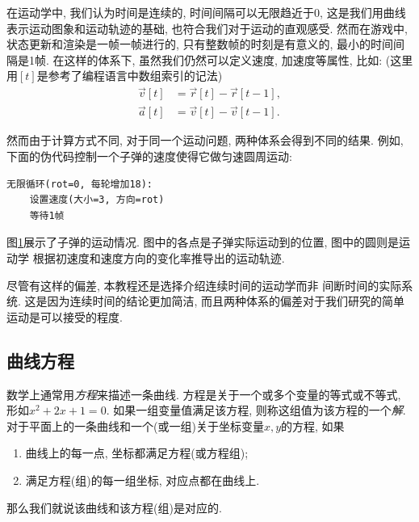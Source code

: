 在运动学中, 我们认为时间是连续的, 时间间隔可以无限趋近于0,
这是我们用曲线表示运动图象和运动轨迹的基础,
也符合我们对于运动的直观感受.
然而在游戏中, 状态更新和渲染是一帧一帧进行的,
只有整数帧的时刻是有意义的, 最小的时间间隔是1帧.
在这样的体系下, 虽然我们仍然可以定义速度, 加速度等属性, 比如:
(这里用$[t]$是参考了编程语言中数组索引的记法)
\begin{align*}
  \vec v[t] & = \vec r[t] - \vec r[t-1], \\
  \vec a[t] & = \vec v[t] - \vec v[t-1].
\end{align*}

然而由于计算方式不同, 对于同一个运动问题, 两种体系会得到不同的结果.
例如, 下面的伪代码控制一个子弹的速度使得它做匀速圆周运动:

\begin{lstlisting}
无限循环(rot=0, 每轮增加18):
    设置速度(大小=3, 方向=rot)
    等待1帧
\end{lstlisting}

图\ref{fig:discrete-time}展示了子弹的运动情况.
图中的各点是子弹实际运动到的位置, 图中的圆则是运动学
根据初速度和速度方向的变化率推导出的运动轨迹.

\begin{figure}[htbp]
  \centering
  \caption{}
  \label{fig:discrete-time}
\end{figure}

尽管有这样的偏差, 本教程还是选择介绍连续时间的运动学而非
间断时间的实际系统. 这是因为连续时间的结论更加简洁,
而且两种体系的偏差对于我们研究的简单运动是可以接受的程度.

\subsection{曲线方程}

数学上通常用\emph{方程}来描述一条曲线.
方程是关于一个或多个变量的等式或不等式, 形如$x^2+2x+1=0$.
如果一组变量值满足该方程, 则称这组值为该方程的一个\emph{解}.
对于平面上的一条曲线和一个(或一组)关于坐标变量$x,y$的方程, 如果
\begin{enumerate}[label=(\alph*)]
  \item 曲线上的每一点, 坐标都满足方程(或方程组);
  \item 满足方程(组)的每一组坐标, 对应点都在曲线上.
\end{enumerate}
那么我们就说该曲线和该方程(组)是对应的.

